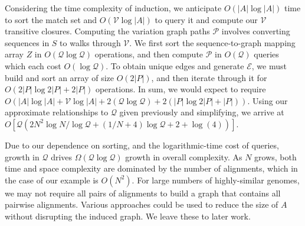 \documentclass{bioinfo}
\theoremstyle{definition}
\begin{document}
Considering the time complexity of induction, we anticipate $O(|A|\log|A|)$ time to sort the match set and $O(\mathcal{V} \log |A|)$ to query it and compute our $\mathcal{V}$ transitive closures.
Computing the variation graph paths $\mathcal{P}$ involves converting sequences in $S$ to walks through $\mathcal{V}$.
We first sort the sequence-to-graph mapping array $Z$ in $O(\mathcal{Q} \log \mathcal{Q})$ operations, and then compute $\mathcal{P}$ in $O(\mathcal{Q})$ queries which each cost $O(\log \mathcal{Q})$.
To obtain unique edges and generate $\mathcal{E}$, we must build and sort an array of size $O(2|P|)$, and then iterate through it for $O(2|P| \log 2|P| + 2|P|)$ operations.
In sum, we would expect to require $O(|A|\log|A| + \mathcal{V} \log |A| + 2(\mathcal{Q} \log \mathcal{Q}) + 2(|P| \log 2|P| + |P|))$.
Using our approximate relationships to $\mathcal{Q}$ given previously and simplifying, we arrive at $O[\mathcal{Q}(2N^2 \log N / \log \mathcal{Q} + (1/N + 4)\log \mathcal{Q} + 2 + \log(4))]$.

Due to our dependence on sorting, and the logarithmic-time cost of queries, growth in $\mathcal{Q}$ drives $\Omega(\mathcal{Q} \log \mathcal{Q})$ growth in overall complexity.
As $N$ grows, both time and space complexity are dominated by the number of alignments, which in the case of our example is $O(N^2)$.
For large numbers of highly-similar genomes, we may not require all pairs of alignments to build a graph that contains all pairwise alignments.
Various approaches could be used to reduce the size of $A$ without disrupting the induced graph.
We leave these to later work.



\end{document}
